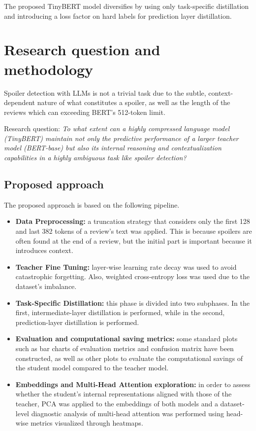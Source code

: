 \documentclass[11pt, a4paper]{article}
\begin{document}
The proposed TinyBERT model diversifies by using only task-specific distillation and introducing a loss factor on hard labels for prediction layer distillation.

\section{Research question and methodology}
Spoiler detection with LLMs is not a trivial task due to the subtle, context-dependent nature of what constitutes a spoiler, as well as the length of the reviews which can exceeding BERT’s 512-token limit. 

Research question: \textit{To what extent can a highly compressed language model (TinyBERT) maintain not only the predictive performance of a larger teacher model (BERT-base) but also its internal reasoning and contextualization capabilities in a highly ambiguous task like spoiler detection?}

\subsection{Proposed approach}
The proposed approach is based on the following pipeline.
\begin{itemize}
\item \textbf{Data Preprocessing:} a truncation strategy that considers only the first 128 and last 382 tokens of a review's text was applied. This is because spoilers are often found at the end of a review, but the initial part is important because it introduces context. \cite{sun2020finetuneberttextclassification}
\item \textbf{Teacher Fine Tuning:} layer-wise learning rate decay was used to avoid catastrophic forgetting. Also, weighted cross-entropy loss was used due to the dataset's imbalance.
\item \textbf{Task-Specific Distillation:} this phase is divided into two subphases. In the first, intermediate-layer distillation is performed, while in the second, prediction-layer distillation is performed.
\item \textbf{Evaluation and computational saving metrics:} some standard plots such as bar charts of evaluation metrics and confusion matrix have been constructed, as well as other plots to evaluate the computational savings of the student model compared to the teacher model.
\item \textbf{Embeddings and Multi-Head Attention exploration:} in order to assess whether the student’s internal representations aligned with those of the teacher, PCA was applied to the embeddings of both models and a dataset-level diagnostic analysis of multi-head attention was performed using head-wise metrics visualized through heatmaps.
\end{itemize}
\end{document}
